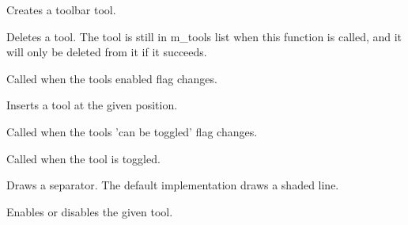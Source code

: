 Creates a toolbar tool.


\label{wxdynamictoolbardodeletetool}


Deletes a tool. The tool is still in m\_tools list when this function is called, and it will
only be deleted from it if it succeeds.


\label{wxdynamictoolbardoenabletool}


Called when the tools enabled flag changes.


\label{wxdynamictoolbardoinserttool}


Inserts a tool at the given position.


\label{wxdynamictoolbardosettoggle}


Called when the tools 'can be toggled' flag changes.


\label{wxdynamictoolbardotoggletool}


Called when the tool is toggled.


\label{wxdynamictoolbardrawseparator}


Draws a separator. The default implementation draws a shaded line.


\label{wxdynamictoolbarenabletool}


Enables or disables the given tool.


\label{wxdynamictoolbarfindtoolforposition}

